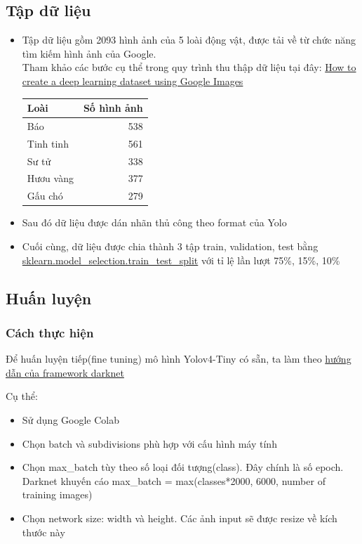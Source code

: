 \documentclass[20pt, a4paper]{article}
\begin{document}
\subsection{Tập dữ liệu}
\begin{itemize}
	\item
Tập dữ liệu gồm 2093 hình ảnh của 5 loài động vật, được tải về từ chức năng tìm kiếm hình ảnh của Google.\\
Tham khảo các bước cụ thể trong quy trình thu thập dữ liệu tại đây: \href{https://www.pyimagesearch.com/2017/12/04/how-to-create-a-deep-learning-dataset-using-google-images/}{How to create a deep learning dataset using Google Images}

\begin{tabular}{l | r}
	\textbf{Loài} & \textbf{Số hình ảnh} \\
	\hline
	Báo & 538 \\
	Tinh tinh & 561 \\
	Sư tử & 338 \\
	Hươu vàng & 377 \\
	Gấu chó & 279 \\
\end{tabular}

\item
Sau đó dữ liệu được dán nhãn thủ công theo format của Yolo

\item
Cuối cùng, dữ liệu được chia thành 3 tập train, validation, test bằng 
\href{https://scikit-learn.org/stable/modules/generated/sklearn.model\_selection.train\_test_split.html}{sklearn.model\_selection.train\_test\_split} với tỉ lệ lần lượt 75\%, 15\%, 10\%
\end{itemize}

\subsection{Huấn luyện}
\subsubsection{Cách thực hiện}
Để huấn luyện tiếp(fine tuning) mô hình Yolov4-Tiny có sẵn, ta làm theo 
\href{https://github.com/AlexeyAB/darknet#how-to-train-tiny-yolo-to-detect-your-custom-objects}{hướng dẫn của framework darknet}

Cụ thể:
\begin{itemize}
	\item Sử dụng Google Colab
	\item Chọn batch và subdivisions phù hợp với cấu hình máy tính
	\item Chọn max\_batch tùy theo số loại đối tượng(class). Đây chính là số epoch. \\
		Darknet khuyến cáo max\_batch = max(classes*2000, 6000, number of training images)
	\item Chọn network size: width và height. Các ảnh input sẽ được resize về kích thước này
\end{itemize}
\end{document}
